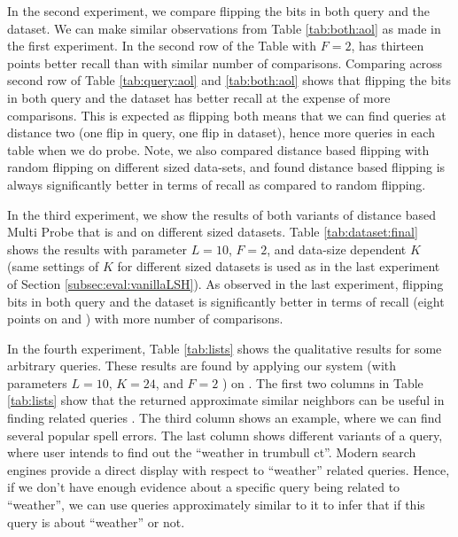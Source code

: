 In the second experiment, we compare flipping the bits in both query and the dataset. We can make similar observations from Table \ref{tab:both:aol} as made in the first experiment. In the second row of the Table with $F=2$, \dflipb has thirteen points better recall than \rflipb with similar number of comparisons. Comparing across second row of  Table \ref{tab:query:aol} and \ref{tab:both:aol} shows that flipping the bits in both query and the dataset has better recall at the expense of more comparisons. This is expected as flipping both means that we can find queries at distance two (one flip in query, one flip in dataset), hence more queries in each table when we do probe. Note, we also compared distance based flipping with random flipping on different sized data-sets, and found distance based flipping is always significantly better in terms of recall as compared to random flipping. 

In the third experiment, we show the results of both variants of distance based Multi Probe that is \dflipq and \dflipb on different sized datasets. Table \ref{tab:dataset:final} shows the results with parameter $L=10$, $F=2$, and data-size dependent $K$ (same settings of $K$ for different sized datasets is used as in the last experiment of Section \ref{subsec:eval:vanillaLSH}). As observed in the last experiment, flipping bits in both query and the dataset is significantly better in terms of recall (eight points on \dataA and \dataB) with more number of comparisons. 

In the fourth experiment, Table \ref{tab:lists} shows the qualitative results for some arbitrary queries. These results are found by applying our system (\dflipb with parameters $L=10$, $K=24$, and $F=2$ ) on \dataC. The first two columns in Table \ref{tab:lists} show that the returned approximate similar neighbors can be useful in finding related queries \cite{Jones06WWW,Jain11SIGIR}. The third column shows an example, where we can find several popular spell errors. The last column shows different variants of a query, where user intends to find out the ``weather in trumbull ct''. Modern search engines provide a direct display with respect to ``weather'' related queries. Hence, if we don't have enough evidence about a specific query being related to ``weather'', we can use queries approximately similar to it to infer that if this query is about ``weather'' or not.  


